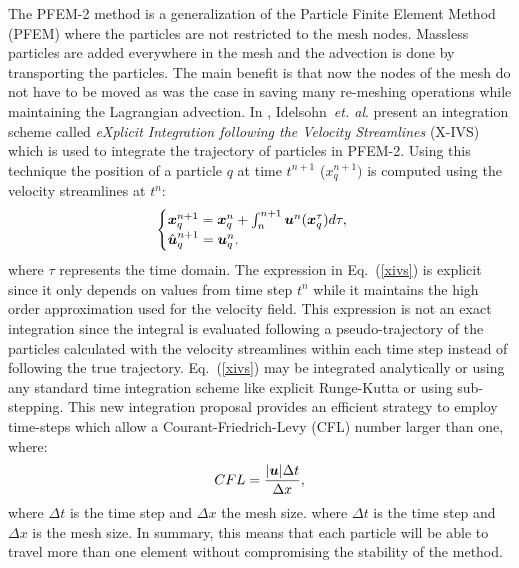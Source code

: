 The PFEM-2 method is a generalization of the Particle Finite Element Method (PFEM) \cite{sergio:pfem} where the particles are not restricted to the mesh nodes. Massless particles are added everywhere in the mesh and the advection is done by transporting the particles. The main benefit is that now the nodes of the mesh do not have to be moved as was the case in \cite{sergio:pfem} saving many re-meshing operations while maintaining the Lagrangian advection. In \cite{sergio:xivs1}, Idelsohn~{\sl et. al}. present an integration scheme called {\em eXplicit Integration following the Velocity Streamlines} (X-IVS) which is used to integrate the trajectory of particles in PFEM-2. Using this technique the position of a particle $q$ at time $t^{n+1}$ ($x_q^{n+1})$ is computed using the velocity streamlines at $t^n$:
%
\begin{equation}\label{xivs}
  \begin{cases}
    \boldsymbol{x}_q^{n+1}=\boldsymbol{x}_q^n+\int_n^{n+1} \boldsymbol{u}^n(\boldsymbol{x}_q^\tau) d\tau,\\
    \hat{\boldsymbol{u}}^{n+1}_q=\boldsymbol{u}_q^n.
  \end{cases}
\end{equation}
where $\tau$ represents the time domain.
%
The expression in Eq.~(\ref{xivs}) is explicit since it only depends on values from time step $t^n$ while it maintains the high order approximation used for the velocity field. This expression is not an exact integration since the integral is evaluated following a pseudo-trajectory of the particles calculated with the velocity streamlines within each time step instead of following the true trajectory. Eq.~(\ref{xivs}) may be integrated analytically or using any standard time integration scheme like explicit Runge-Kutta or using sub-stepping. This new integration proposal provides an efficient strategy to employ time-steps which allow a Courant-Friedrich-Levy (CFL) number larger than one, where:
%
\begin{equation}
  CFL=\frac{|\boldsymbol{u}|\Delta t}{\Delta x},
\end{equation}
where $\Delta t$ is the time step and $\Delta x$ the mesh size.
%
where $\Delta t$ is the time step and $\Delta x$ is the mesh size.
In summary, this means that each particle will be able to travel more than one element without compromising the stability of the method.

